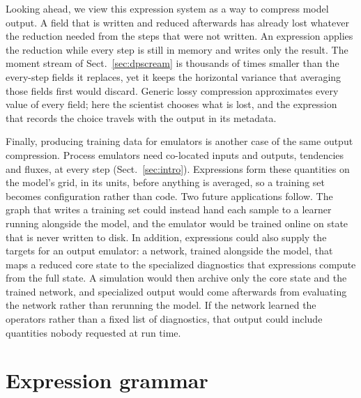 \documentclass[gmd, manuscript]{copernicus}
\newcommand{\todo}[1]{\textcolor{red}{\textbf{[TODO: #1]}}}
\begin{document}
Looking ahead, we view this expression system as a way to compress model output. A field that is written and reduced afterwards has already lost whatever the reduction needed from the steps that were not written. An expression applies the reduction while every step is still in memory and writes only the result. The moment stream of Sect.~\ref{sec:dpscream} is thousands of times smaller than the every-step fields it replaces, yet it keeps the horizontal variance that averaging those fields first would discard. Generic lossy compression approximates every value of every field; here the scientist chooses what is lost, and the expression that records the choice travels with the output in its metadata.

Finally, producing training data for emulators is another case of the same output compression. Process emulators need co-located inputs and outputs, tendencies and fluxes, at every step (Sect.~\ref{sec:intro}). Expressions form these quantities on the model's grid, in its units, before anything is averaged, so a training set becomes configuration rather than code. Two future applications follow. The graph that writes a training set could instead hand each sample to a learner running alongside the model, and the emulator would be trained online on state that is never written to disk. In addition, expressions could also supply the targets for an output emulator: a network, trained alongside the model, that maps a reduced core state to the specialized diagnostics that expressions compute from the full state. A simulation would then archive only the core state and the trained network, and specialized output would come afterwards from evaluating the network rather than rerunning the model. If the network learned the operators rather than a fixed list of diagnostics, that output could include quantities nobody requested at run time.


\codeavailability{\todo{}}

\dataavailability{\todo{}}

\appendix

\section{Expression grammar}
\label{app:grammar}
\end{document}
